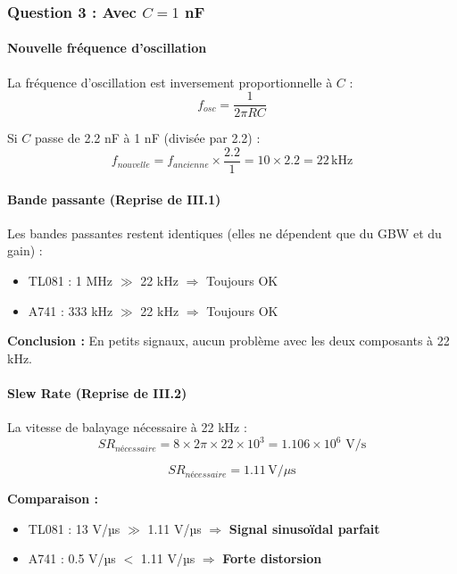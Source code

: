 \documentclass[11pt,a4paper]{article}
\begin{document}
\subsubsection{Question 3 : Avec $C = 1$ nF}

\paragraph{Nouvelle fréquence d'oscillation}

La fréquence d'oscillation est inversement proportionnelle à $C$ :
\begin{equation}
f_{osc} = \frac{1}{2\pi RC}
\end{equation}

Si $C$ passe de 2.2 nF à 1 nF (divisée par 2.2) :
\begin{equation}
f_{nouvelle} = f_{ancienne} \times \frac{2.2}{1} = 10 \times 2.2 = 22 \, \text{kHz}
\end{equation}

\paragraph{Bande passante (Reprise de III.1)}

Les bandes passantes restent identiques (elles ne dépendent que du GBW et du gain) :
\begin{itemize}
    \item TL081 : 1 MHz $\gg$ 22 kHz $\Rightarrow$ Toujours OK
    \item A741 : 333 kHz $\gg$ 22 kHz $\Rightarrow$ Toujours OK
\end{itemize}

\textbf{Conclusion :} En petits signaux, aucun problème avec les deux composants à 22 kHz.

\paragraph{Slew Rate (Reprise de III.2)}

La vitesse de balayage nécessaire à 22 kHz :
\begin{equation}
SR_{nécessaire} = 8 \times 2\pi \times 22 \times 10^3 = 1.106 \times 10^6 \text{ V/s}
\end{equation}

\begin{equation}
\boxed{SR_{nécessaire} = 1.11 \, \text{V}/\mu\text{s}}
\end{equation}

\textbf{Comparaison :}
\begin{itemize}
    \item TL081 : 13 V/µs $\gg$ 1.11 V/µs $\Rightarrow$ \textbf{Signal sinusoïdal parfait}
    \item A741 : 0.5 V/µs $<$ 1.11 V/µs $\Rightarrow$ \textbf{Forte distorsion}
\end{itemize}
\end{document}
